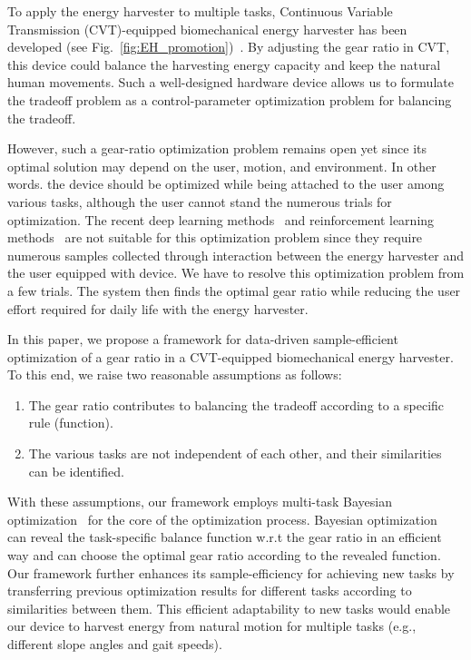 \documentclass[twocolumn]{svjour3}          %
\begin{document}
To apply the energy harvester to multiple tasks, Continuous Variable Transmission (CVT)-equipped biomechanical energy harvester has been developed (see Fig.~\ref{fig:EH_promotion})~\cite{ikawa2018biomechanical, singla2016optimization}.
By adjusting the gear ratio in CVT, this device could balance the harvesting energy capacity and keep the natural human movements.
Such a well-designed hardware device allows us to formulate the tradeoff problem as a control-parameter optimization problem for balancing the tradeoff.

However, such a gear-ratio optimization problem remains open yet since its optimal solution may depend on the user, motion, and environment.
In other words. the device should be optimized while being attached to the user among various tasks, although the user cannot stand the numerous trials for optimization.
The recent deep learning methods~\cite{lecun2015deep} and reinforcement learning methods~\cite{sutton2018reinforcement} are not suitable for this optimization problem since they require numerous samples collected through interaction between the energy harvester and the user equipped with device.
We have to resolve this optimization problem from a few trials.
The system then finds the optimal gear ratio while reducing the user effort required for daily life with the energy harvester.

In this paper, we propose a framework for data-driven sample-efficient optimization of a gear ratio in a CVT-equipped biomechanical energy harvester.
To this end, we raise two reasonable assumptions as follows:
\begin{enumerate}
\item The gear ratio contributes to balancing the tradeoff according to a specific rule (function).
\item The various tasks are not independent of each other, and their similarities can be identified.
\end{enumerate}
With these assumptions, our framework employs multi-task Bayesian optimization~\cite{swersky2013multi} for the core of the optimization process.
Bayesian optimization~\cite{srinivas2010gaussian} can reveal the task-specific balance function w.r.t the gear ratio in an efficient way and can choose the optimal gear ratio according to the revealed function.
Our framework further enhances its sample-efficiency for achieving new tasks by transferring previous optimization results for different tasks according to similarities between them.
This efficient adaptability to new tasks would enable our device to harvest energy from natural motion for multiple tasks (e.g., different slope angles and gait speeds).
\end{document}
